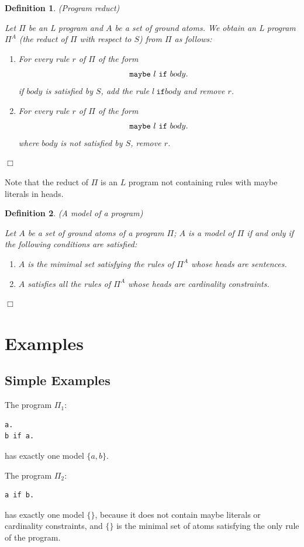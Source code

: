 \documentclass[a4paper,10pt]{article}
\newtheorem{definition}{Definition}
\begin{document}
\begin{definition}(Program reduct) \\
\rm{
Let $\Pi$ be an L program and $A$ be a set of ground atoms.
We obtain an L program $\Pi^A$ (the \textit{reduct} of $\Pi$ with respect to $S$) from $\Pi$ as follows:
\begin{enumerate}
\item For every rule  $r$ of $\Pi$ of the form
$$\mbox{\texttt{maybe}}~l~\mbox{\texttt{if}}~body.$$ 
if $body$ is satisfied by $S$, add the rule $l~ \texttt{if} body$ and remove $r$.
\item For every rule  $r$ of $\Pi$ of the form
$$\mbox{\texttt{maybe}}~l~\mbox{\texttt{if}}~body.$$  where $body$ is not satisfied by $S$, remove $r$.
\end{enumerate}
}
\hfill$\Box$
\end{definition}
Note that the reduct of $\Pi$ is an $L$ program  not containing rules with maybe literals in heads.
\begin{definition}(A model of a program)\\
\rm{
Let $A$ be a set of ground atoms of a program $\Pi$; $A$ is a model of $\Pi$ if and only if the following conditions are satisfied:
\begin{enumerate}
\item $A$ is the mimimal set satisfying the rules of $\Pi^A$ whose heads are sentences.
\item $A$ satisfies all the rules of $\Pi^A$ whose heads are cardinality constraints.
\end{enumerate}
}
\hfill$\Box$
\end{definition}

\section{Examples}

\subsection{Simple Examples} 

The program $\Pi_1$:
\begin{verbatim}
a.
b if a.
\end{verbatim}
has exactly one model $\{a,b\}$.

\medskip\noindent
The program $\Pi_2$:
\begin{verbatim}
a if b.
\end{verbatim}
has exactly one model $\{\}$, because it  does not contain maybe literals or cardinality constraints, and $\{\}$ is the minimal set of atoms satisfying the only rule of the program.
\end{document}
